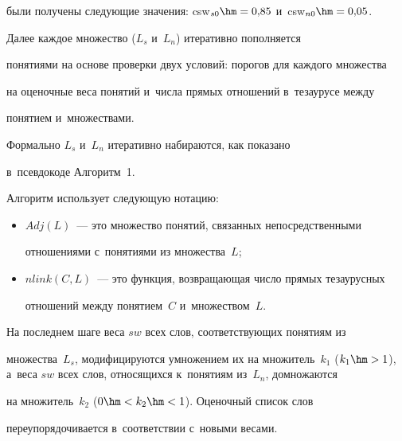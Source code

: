 были получены следующие значения: csw$_{s0}\hm=0{,}85$ и~csw$_{n0}\hm=0{,}05$.





     Далее каждое множество ($L_s$ и~$L_n$) итеративно пополняется


понятиями на основе проверки двух условий: порогов для каждого множества


на оценочные веса понятий и~числа прямых отношений в~тезаурусе между


понятием и~множест\-вами.


{ %





}





     Формально $L_s$ и~$L_n$ итеративно набираются, как показано


     в~псевдокоде Алгоритм~1.





     Алгоритм использует следующую нотацию:


     \begin{itemize}


\item $Adj (L)$~--- это множество понятий, связанных непосредственными


отношениями с~понятиями из множества~$L$;


\item $nlink (C, L)$~--- это функция, возвращающая число прямых тезаурусных


отношений между понятием~$C$ и~множеством~$L$.


	\end{itemize}


	


  На последнем шаге веса $sw$ всех слов, соответствующих понятиям из


множества~$L_s$, модифицируются умножением их на множитель~$k_1$ ($k_1


\hm>1$), а~веса $sw$ всех слов, относящихся к~понятиям из~$L_n$, домножаются


на множитель~$k_2$ ($0 \hm< k_2 \hm< 1$). Оценочный список слов


переупорядочивается в~соответствии с~новыми весами.





